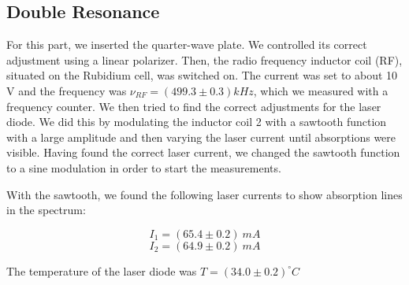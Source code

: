 \clearpage
\subsection{Double Resonance}

For this part, we inserted the quarter-wave plate. We controlled its correct adjustment using a linear polarizer. Then, the radio frequency inductor coil (RF), situated on the Rubidium cell, was switched on. The current was set to about 10 V and the frequency was $\nu_{RF} = (499.3 \pm 0.3) kHz$, which we measured with a frequency counter. We then tried to find the correct adjustments for the laser diode. We did this by modulating the inductor coil 2 with a sawtooth function with a large amplitude and then varying the laser current until absorptions were visible. Having found the correct laser current, we changed the sawtooth function to a sine modulation in order to start the measurements.

With the sawtooth, we found the following laser currents to show absorption lines in the spectrum:

$$ I_1 = (65.4 \pm 0.2)\ mA $$
$$ I_2 = (64.9 \pm 0.2 )\ mA $$

The temperature of the laser diode was $T=(34.0 \pm 0.2)^\circ C$
 
